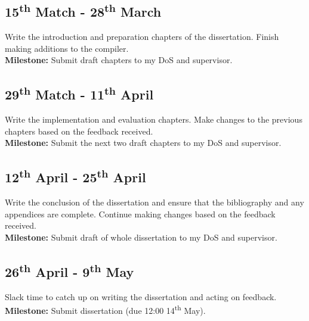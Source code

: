 \documentclass[12pt]{article}
\begin{document}
\subsection*{15\textsuperscript{th} Match - 28\textsuperscript{th} March}%
Write the introduction and preparation chapters of the dissertation. Finish making additions to the compiler. \\
\textbf{Milestone: }Submit draft chapters to my DoS and supervisor.


\subsection*{29\textsuperscript{th} Match - 11\textsuperscript{th} April}%
Write the implementation and evaluation chapters. Make changes to the previous chapters based on the feedback received. \\
\textbf{Milestone: }Submit the next two draft chapters to my DoS and supervisor.


\subsection*{12\textsuperscript{th} April - 25\textsuperscript{th} April}%
Write the conclusion of the dissertation and ensure that the bibliography and any appendices are complete. Continue making changes based on the feedback received. \\
\textbf{Milestone: }Submit draft of whole dissertation to my DoS and supervisor.

\subsection*{26\textsuperscript{th} April - 9\textsuperscript{th} May}%
Slack time to catch up on writing the dissertation and acting on feedback.\\%
\textbf{Milestone: }Submit dissertation (due 12:00 14\textsuperscript{th} May).
\end{document}
